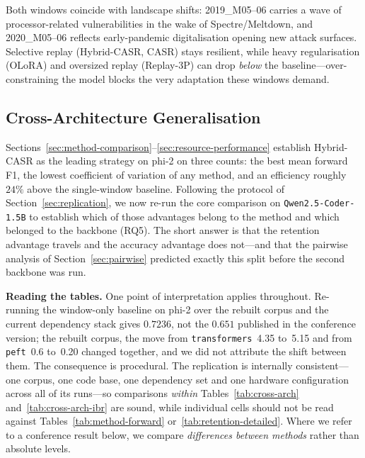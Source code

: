 \documentclass[a4paper,twoside]{article}
\begin{document}
Both windows coincide with landscape shifts: 2019\_M05--06 carries a wave of processor-related vulnerabilities in the wake of Spectre/Meltdown, and 2020\_M05--06 reflects early-pandemic digitalisation opening new attack surfaces. Selective replay (Hybrid-CASR, CASR) stays resilient, while heavy regularisation (OLoRA) and oversized replay (Replay-3P) can drop \emph{below} the baseline---over-constraining the model blocks the very adaptation these windows demand.

\subsection{Cross-Architecture Generalisation}
\label{sec:cross-arch}

\noindent
Sections~\ref{sec:method-comparison}--\ref{sec:resource-performance} establish Hybrid-CASR as the leading strategy on phi-2 on three counts: the best mean forward F1, the lowest coefficient of variation of any method, and an efficiency roughly $24\%$ above the single-window baseline. Following the protocol of Section~\ref{sec:replication}, we now re-run the core comparison on \texttt{Qwen2.5-Coder-1.5B} to establish which of those advantages belong to the method and which belonged to the backbone (RQ5). The short answer is that the retention advantage travels and the accuracy advantage does not---and that the pairwise analysis of Section~\ref{sec:pairwise} predicted exactly this split before the second backbone was run.

\textbf{Reading the tables.} One point of interpretation applies throughout. Re-running the window-only baseline on phi-2 over the rebuilt corpus and the current dependency stack gives $0.7236$, not the $0.651$ published in the conference version; the rebuilt corpus, the move from \texttt{transformers}~4.35 to~5.15 and from \texttt{peft}~0.6 to~0.20 changed together, and we did not attribute the shift between them. The consequence is procedural. The replication is internally consistent---one corpus, one code base, one dependency set and one hardware configuration across all of its runs---so comparisons \emph{within} Tables~\ref{tab:cross-arch} and~\ref{tab:cross-arch-ibr} are sound, while individual cells should not be read against Tables~\ref{tab:method-forward} or~\ref{tab:retention-detailed}. Where we refer to a conference result below, we compare \emph{differences between methods} rather than absolute levels.
\end{document}
